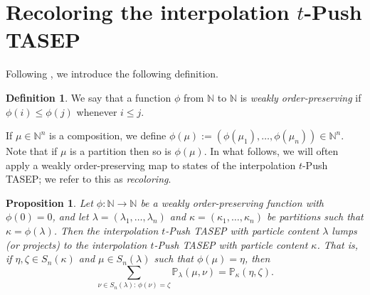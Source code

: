 \documentclass[12pt]{amsart}
\newtheorem{prop}[thm]{Proposition}
\theoremstyle{definition}
\newtheorem{definition}[thm]{Definition}
\DeclareMathOperator{\wt}{wt}
\newcommand{\wtp}{\textup{wt}'}
\DeclareMathOperator{\sign}{sign}
\newcommand{\ZZ}{\mathbb Z}
\newcommand{\NN}{\mathbb N}
\newcommand{\OO}{\mathbb{O}}
\newcommand{\PP}{\mathbb P}
\begin{document}

\iffalse 
\section{Recoloring the interpolation \texorpdfstring{$t$}{t}-Push TASEP}\label{sec:recoloring_Push_TASEP}
Following \cite{AyyerMartinWilliams2025}, we introduce the following definition.
\begin{definition}
    We say that a function $\phi$ from $\NN$ to $\NN$ is \emph{weakly order-preserving} if $\phi(i)\leq \phi(j)$ whenever $i\leq j$.
\end{definition}
If $\mu\in \NN^n$ is a composition, we define $\phi(\mu):=(\phi(\mu_1),\dots,\phi(\mu_n))\in \NN^n$.
Note that if $\mu$ is a partition then so is $\phi(\mu)$. In what follows, we will often apply a weakly order-preserving map to states of the interpolation $t$-Push TASEP; we refer to this as 
\emph{recoloring}.


\begin{prop}\label{prop:lumping}
    Let $\phi:\NN \to \NN$ be a weakly order-preserving function with $\phi(0)=0$, and let $\lambda=(\lambda_1,\dots,\lambda_n)$ and $\kappa=(\kappa_1,\dots,\kappa_n)$ be  partitions such that $\kappa=\phi(\lambda)$.
Then the interpolation $t$-Push TASEP with particle content $\lambda$ lumps (or projects) to the interpolation $t$-Push TASEP with particle content $\kappa$.  That is,  
    if $\eta,\zeta\in S_n(\kappa)$ and $\mu\in S_n(\lambda)$ such that $\phi(\mu)=\eta$, then
    $$\sum_{\nu\in S_n(\lambda):\, \phi(\nu)=\zeta}\PP_{\lambda}(\mu,\nu)=\PP_\kappa(\eta,\zeta).$$
\end{prop}
\end{document}
